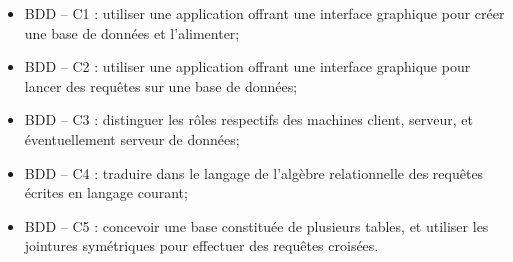 \documentclass[10pt]{article}
\begin{document}

\vspace{.5cm}

\begin{savoir}
\begin{itemize}
\item BDD -- C1 : utiliser une application offrant une interface graphique pour créer une base de données et l’alimenter;
\item BDD -- C2 : utiliser une application offrant une interface graphique pour lancer des requêtes sur une base de données;
\item BDD -- C3 : distinguer les rôles respectifs des machines client, serveur, et éventuellement serveur de données;
\item BDD -- C4 : traduire dans le langage de l’algèbre relationnelle des requêtes écrites en langage courant;
\item BDD -- C5 : concevoir une base constituée de plusieurs tables, et utiliser les jointures symétriques pour effectuer des requêtes croisées.
\end{itemize}
\end{savoir}



\setlength{\parskip}{0ex plus 0.2ex minus 0ex}
 \renewcommand{\contentsname}{}
 \renewcommand{\baselinestretch}{1}

\tableofcontents

 \renewcommand{\baselinestretch}{1.2}
\setlength{\parskip}{2ex plus 0.5ex minus 0.2ex}


\end{document}
